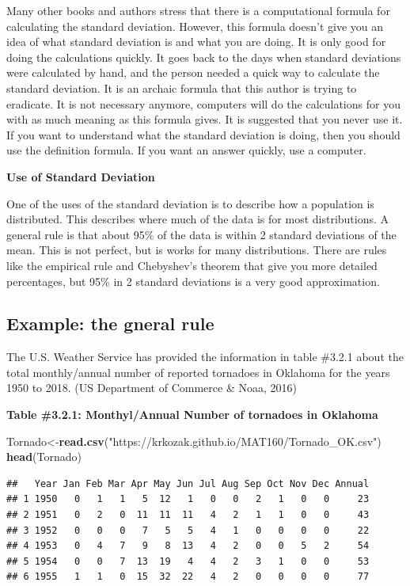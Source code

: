 \documentclass[]{book}
\newenvironment{Shaded}{\begin{snugshade}}{\end{snugshade}}
\newcommand{\KeywordTok}[1]{\textcolor[rgb]{0.13,0.29,0.53}{\textbf{#1}}}
\newcommand{\NormalTok}[1]{#1}
\newcommand{\StringTok}[1]{\textcolor[rgb]{0.31,0.60,0.02}{#1}}
\begin{document}
Many other books and authors stress that there is a computational formula for calculating the standard deviation. However, this formula doesn't give you an idea of what standard deviation is and what you are doing. It is only good for doing the calculations quickly. It goes back to the days when standard deviations were calculated by hand, and the person needed a quick way to calculate the standard deviation. It is an archaic formula that this author is trying to eradicate. It is not necessary anymore, computers will do the calculations for you with as much meaning as this formula gives. It is suggested that you never use it. If you want to understand what the standard deviation is doing, then you should use the definition formula. If you want an answer quickly, use a computer.

\textbf{Use of Standard Deviation}

One of the uses of the standard deviation is to describe how a population is distributed. This describes where much of the data is for most distributions. A general rule is that about 95\% of the data is within 2 standard deviations of the mean. This is not perfect, but is works for many distributions. There are rules like the empirical rule and Chebyshev's theorem that give you more detailed percentages, but 95\% in 2 standard deviations is a very good approximation.

\hypertarget{example-the-gneral-rule}{%
\subsection{Example: the gneral rule}\label{example-the-gneral-rule}}

The U.S. Weather Service has provided the information in table \#3.2.1 about the total monthly/annual number of reported tornadoes in Oklahoma for the years 1950 to 2018. (US Department of Commerce \& Noaa, 2016)

\textbf{Table \#3.2.1: Monthyl/Annual Number of tornadoes in Oklahoma}

\begin{Shaded}
\begin{Highlighting}[]
\NormalTok{Tornado<-}\KeywordTok{read.csv}\NormalTok{(}\StringTok{"https://krkozak.github.io/MAT160/Tornado_OK.csv"}\NormalTok{)}
\KeywordTok{head}\NormalTok{(Tornado)}
\end{Highlighting}
\end{Shaded}

\begin{verbatim}
##   Year Jan Feb Mar Apr May Jun Jul Aug Sep Oct Nov Dec Annual
## 1 1950   0   1   1   5  12   1   0   0   2   1   0   0     23
## 2 1951   0   2   0  11  11  11   4   2   1   1   0   0     43
## 3 1952   0   0   0   7   5   5   4   1   0   0   0   0     22
## 4 1953   0   4   7   9   8  13   4   2   0   0   5   2     54
## 5 1954   0   0   7  13  19   4   4   2   3   1   0   0     53
## 6 1955   1   1   0  15  32  22   4   2   0   0   0   0     77
\end{verbatim}
\end{document}
